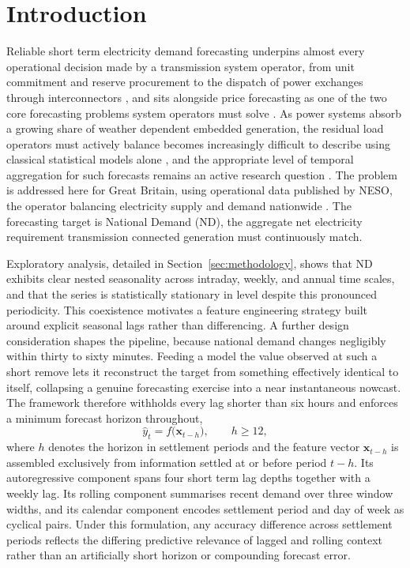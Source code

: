 \documentclass[runningheads]{llncs}
\begin{document}
\section{Introduction}
\label{sec:intro}

Reliable short term electricity demand forecasting underpins almost every operational decision made by a transmission system operator, from unit commitment and reserve procurement to the dispatch of power exchanges through interconnectors \cite{hyndman2018forecasting}, and sits alongside price forecasting as one of the two core forecasting problems system operators must solve \cite{weron2014electricity}. As power systems absorb a growing share of weather dependent embedded generation, the residual load operators must actively balance becomes increasingly difficult to describe using classical statistical models alone \cite{taylor2012short,fan2012short}, and the appropriate level of temporal aggregation for such forecasts remains an active research question \cite{sevlian2018scaling}. The problem is addressed here for Great Britain, using operational data published by NESO, the operator balancing electricity supply and demand nationwide \cite{neso2025historic}. The forecasting target is National Demand (ND), the aggregate net electricity requirement transmission connected generation must continuously match.

Exploratory analysis, detailed in Section~\ref{sec:methodology}, shows that ND exhibits clear nested seasonality across intraday, weekly, and annual time scales, and that the series is statistically stationary in level despite this pronounced periodicity. This coexistence motivates a feature engineering strategy built around explicit seasonal lags rather than differencing. A further design consideration shapes the pipeline, because national demand changes negligibly within thirty to sixty minutes. Feeding a model the value observed at such a short remove lets it reconstruct the target from something effectively identical to itself, collapsing a genuine forecasting exercise into a near instantaneous nowcast. The framework therefore withholds every lag shorter than six hours and enforces a minimum forecast horizon throughout,
\begin{equation}
\hat{y}_{t} = f\big(\mathbf{x}_{t-h}\big), \qquad h \geq 12,
\label{eq:direct_forecast}
\end{equation}
where $h$ denotes the horizon in settlement periods and the feature vector $\mathbf{x}_{t-h}$ is assembled exclusively from information settled at or before period $t-h$. Its autoregressive component spans four short term lag depths together with a weekly lag. Its rolling component summarises recent demand over three window widths, and its calendar component encodes settlement period and day of week as cyclical pairs. Under this formulation, any accuracy difference across settlement periods reflects the differing predictive relevance of lagged and rolling context rather than an artificially short horizon or compounding forecast error.
\end{document}

